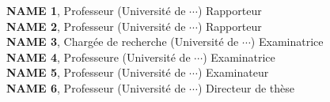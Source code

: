 \begin{titlepage}
\centering

\textbf{NAME 1}, Professeur (Université de $\cdots$) \hfill Rapporteur \\
\textbf{NAME 2}, Professeur (Université de $\cdots$) \hfill Rapporteur \\
\textbf{NAME 3}, Chargée de recherche (Université de $\cdots$) \hfill Examinatrice \\
\textbf{NAME 4}, Professeure (Université de $\cdots$) \hfill Examinatrice \\
\textbf{NAME 5}, Professeur (Université de $\cdots$) \hfill Examinateur \\
\textbf{NAME 6}, Professeur (Université de $\cdots$) \hfill Directeur de thèse


\end{titlepage}
\restoregeometry
\newpage
\null\thispagestyle{empty}
\newpage
{}
\setcounter{page}{1}